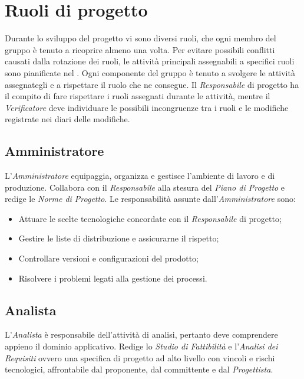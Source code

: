 \section{Ruoli di progetto}

Durante lo sviluppo del progetto vi sono diversi ruoli, che ogni membro del gruppo \GroupName{} è tenuto a ricoprire almeno una volta. Per evitare possibili conflitti causati dalla rotazione dei ruoli, le attività principali assegnabili a specifici ruoli sono pianificate nel \PianoDiProgetto. Ogni componente del gruppo è tenuto a svolgere le attività assegnategli e a rispettare il ruolo che ne consegue. Il \textit{Responsabile} di progetto ha il compito di fare rispettare i ruoli assegnati durante le attività, mentre il \textit{Verificatore} deve individuare le possibili incongruenze tra i ruoli e le modifiche registrate nei diari delle modifiche.

	\subsection{Amministratore}
	
	L'\textit{Amministratore} equipaggia, organizza e gestisce l'ambiente di lavoro e di produzione. Collabora con il \textit{Responsabile} alla stesura del \textit{Piano di Progetto} e redige le \textit{Norme di Progetto}.
	Le responsabilità assunte dall'\textit{Amministratore} sono:

	\begin{itemize}

		\item Attuare le scelte tecnologiche concordate con il \textit{Responsabile} di progetto;
		\item Gestire le liste di distribuzione e assicurarne il rispetto;
		\item Controllare versioni e configurazioni del prodotto;
		\item Risolvere i problemi legati alla gestione dei processi.

	\end{itemize}


	\subsection{Analista}

	L'\textit{Analista} è responsabile dell'attività di analisi, pertanto deve comprendere appieno il dominio applicativo. Redige lo \textit{Studio di Fattibilità} e l'\textit{Analisi dei Requisiti} ovvero una specifica di progetto ad alto livello con vincoli e rischi tecnologici, affrontabile dal proponente, dal committente e dal \textit{Progettista}.


